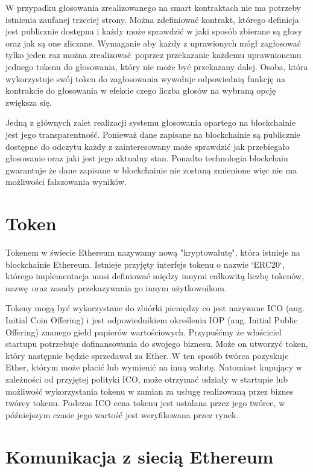 \documentclass[]{llncs}
\begin{document}
  W przypadku głosowania zrealizowanego na smart kontraktach nie ma potrzeby
  istnienia zaufanej trzeciej strony. Można zdefiniować kontrakt, którego
  definicja jest publicznie dostępna i każdy może sprawdzić w jaki sposób
  zbierane są głosy oraz jak są one zliczane. Wymaganie aby każdy z uprawionych
  mógł zagłosować tylko jeden raz można zrealizować poprzez przekazanie każdemu
  uprawnionemu jednego tokenu do głosowania, który nie może być przekazany
  dalej.  Osoba, która wykorzystuje swój token do zagłosowania wywołuje
  odpowiednią funkcję na kontrakcie do głosowania w efekcie czego liczba głosów
  na wybraną opcję zwiększa się.

  Jedną z głównych zalet realizacji systemu głosowania opartego na blockchainie
  jest jego transparentność. Ponieważ dane zapisane na blockchainie są
  publicznie dostępne do odczytu każdy z zainteresowany może sprawdzić jak
  przebiegało głosowanie oraz jaki jest jego aktualny stan. Ponadto technologia
  blockchain gwarantuje że dane zapisane w blockchainie nie zostaną zmienione
  więc nie ma możliwości fałszowania wyników.

\section{Token}

  Tokenem w świecie Ethereum nazywamy nową "kryptowalutę", która istnieje na
  blockchainie Ethereum. Istnieje przyjęty interfejs tokenu o nazwie `ERC20`,
  którego implementacja musi definiować między innymi całkowitą liczbę tokenów,
  nazwę oraz zasady przekazywania go innym użytkownikom.

  Tokeny mogą być wykorzystane do zbiórki pieniędzy co jest nazywane ICO (ang.
  Initial Coin Offering) i jest odpowiednikiem określenia IOP (ang. Initial
  Public Offering) znanego giełd papierów wartościowych. Przypuśćmy że
  właściciel startupu potrzebuje dofinansowania do swojego biznesu. Może on
  utworzyć token, który następnie będzie sprzedawał za Ether. W ten sposób
  twórca pozyskuje Ether, którym może płacić lub wymienić na inną walutę.
  Natomiast kupujący w zależności od przyjętej polityki ICO, może otrzymać
  udziały w startupie lub możliwość wykorzystania tokenu w zamian za usługę
  realizowaną przez biznes twórcy tokenu. Podczas ICO cena tokenu jest ustalana
  przez jego twórce, w późniejszym czasie jego wartość jest weryfikowana przez
  rynek.

\section{Komunikacja z siecią Ethereum}
\end{document}
